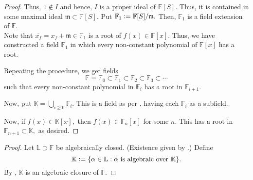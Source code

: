 \begin{proof}
    Thus, $1 \notin I$ and hence, $I$ is a proper ideal of $\mathbb{F}[S].$ Thus, it is contained in some maximal ideal $\mathfrak{m} \subset \mathbb{F}[S].$ Put $\mathbb{F}_1 \vcentcolon= \mathbb{F}[S]/\mathfrak{m}.$ Then, $\mathbb{F}_1$ is a field extension of $\mathbb{F}.$ \\
    Note that $\overline{x_f} = x_f + \mathfrak{m} \in \mathbb{F}_1$ is a root of $f(x) \in \mathbb{F}[x].$ Thus, we have constructed a field $\mathbb{F}_1$ in which every non-constant polynomial of $\mathbb{F}[x]$ has a root.

    Repeating the procedure, we get fields 
    \begin{equation*} 
        \mathbb{F} = \mathbb{F}_0 \subset \mathbb{F}_1 \subset \mathbb{F}_2 \subset \mathbb{F}_3 \subset \cdots
    \end{equation*} 
    such that every non-constant polynomial in $\mathbb{F}_i$ has a root in $\mathbb{F}_{i + 1}.$

    Now, put $\mathbb{K} = \bigcup_{i \ge 0}\mathbb{F}_i.$ This is a field as per , having each $\mathbb{F}_i$ as a subfield. 

    Now, if $f(x) \in \mathbb{K}[x],$ then $f(x) \in \mathbb{F}_n[x]$ for some $n.$ This has a root in $\mathbb{F}_{n + 1} \subset \mathbb{K},$ as desired.
\end{proof}

\algclosure*\label{cor:algclosure2}
\begin{flushright}\hyperref[cor:algclosure]{\upsym}\end{flushright}
\begin{proof}
    Let $\mathbb{L} \supset \mathbb{F}$ be algebraically closed. (Existence given by .) Define
    \begin{equation*} 
        \mathbb{K} \vcentcolon= \{\alpha \in \mathbb{L} : \alpha \text{ is algebraic over }\mathbb{K}\}.
    \end{equation*}
    By , $\mathbb{K}$ is an algebraic closure of $\mathbb{F}.$
\end{proof}

